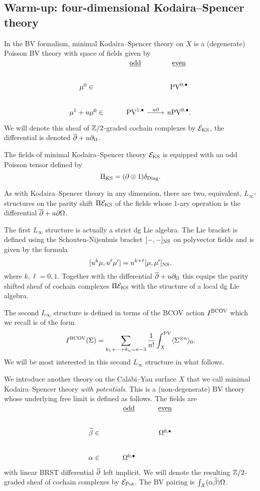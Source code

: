 \documentclass[11pt]{amsart}
\def\PV{{\rm PV}}
\begin{document}
\subsection{Warm-up: four-dimensional Kodaira--Spencer theory}

In the BV formalism, minimal Kodaira--Spencer theory on $X$ is a (degenerate) Poisson BV theory with space of fields given by
\[
\begin{tikzcd}
& \ul{\rm odd} & \ul{\rm even} \\
\mu^0 \in & & \PV^{0,\bu} \\
\mu^1 + u \mu^0 \in & \PV^{1,\bu} \ar[r, "u \partial"] & u \PV^{0,\bu} .
\end{tikzcd}
\]
We will denote this sheaf of $\ZZ /2$-graded cochain complexes by $\cE_{\rm KS}$, the differential is denoted $\dbar + u \partial_\Omega$. 

The fields of minimal Kodaira--Spencer theory $\cE_{\rm KS}$ is equipped with an odd Poisson tensor defined by
\[
\Pi_{\rm KS} = (\partial \otimes 1) \delta_{\rm Diag} .
\]

As with Kodaira--Spencer theory in any dimension, there are two, equivalent, $L_\infty$-structures on the parity shift $\Pi \cE_{\rm KS}$ of the fields whose $1$-ary operation is the differential $\dbar + u \partial \Omega$. 

The first $L_\infty$ structure is actually a strict dg Lie algebra.
The Lie bracket is defined using the Schouten-Nijenhuis bracket $[-,-]_{\rm NS}$ on polyvector fields and is given by the formula
\[
[u^k \mu , u^\ell \mu'] = u^{k+\ell} [\mu, \mu']_{\rm NS} .
\]
where $k, \ell = 0,1$.
Together with the differential $\dbar + u \partial_\Omega$ this equips the parity shifted sheaf of cochain complexes $\Pi \cE_{\rm KS}$ with the structure of a local dg Lie algebra.

The second $L_\infty$ structure is defined in terms of the BCOV action $I^{\rm BCOV}$ which we recall is of the form
\[
I^{\rm BCOV} (\Sigma) = \sum_{\\ k_1 + \cdots + k_n = n-3} \frac{1}{n!} \int_X^{\rm PV} \<\Sigma^{\otimes n}\>_0 .
\]
We will be most interested in this second $L_\infty$ structure in what follows. 

We introduce another theory on the Calabi--Yau surface $X$ that we call minimal Kodaira--Spencer theory {\em with potentials}.
This is a (non-degenerate) BV theory whose underlying free limit is defined as follows.
The fields are
\[
\begin{tikzcd}
& \ul{\rm odd} & \ul{\rm even} \\
\Tilde{\beta} \in & & \Omega^{0,\bu} \\
\alpha \in & \Omega^{0,\bu}  
\end{tikzcd}
\]
with linear BRST differential $\dbar$ left implicit. 
We will denote the resulting $\ZZ /2$-graded sheaf of cochain complexes by $\cE_{\rm Pot}$.
The BV pairing is $\int_X (\alpha \Tilde{\beta}) \Omega$. 
\end{document}
